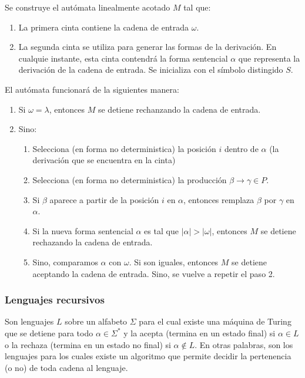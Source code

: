 \begin{demo}[0.8\textwidth]
  Se construye el autómata linealmente acotado \(M\) tal que:
  \begin{enumerate}
    \item La primera cinta contiene la cadena de entrada \textcentoldstyle\(\omega\)\textdollar.
    \item La segunda cinta se utiliza para generar las formas de la derivación. En cualquie instante, esta cinta contendrá la forma sentencial \(\alpha\) que representa la derivación de la cadena de entrada. Se inicializa con el símbolo distingido \(S\).
  \end{enumerate}

  El autómata funcionará de la siguientes manera:
  \begin{enumerate}
    \item Si \(\omega=\lambda\), entonces \(M\) se detiene rechanzando la cadena de entrada.
    \item Sino:
          \begin{enumerate}
            \item Selecciona (en forma no deterministica) la posición \(i\) dentro de \(\alpha\) (la derivación que se encuentra en la cinta)
            \item Selecciona (en forma no deterministica) la producción \(\beta\to\gamma\in P\).
            \item Si \(\beta\) aparece a partir de la posición \(i\) en \(\alpha\), entonces remplaza \(\beta\) por \(\gamma\) en \(\alpha\).
            \item Si la nueva forma sentencial \(\alpha\) es tal que \(|\alpha| > |\omega|\), entonces \(M\) se detiene rechazando la cadena de entrada.
            \item Sino, comparamos \(\alpha\) con \(\omega\). Si son iguales, entonces \(M\) se detiene aceptando la cadena de entrada. Sino, se vuelve a repetir el paso 2.
          \end{enumerate}
  \end{enumerate}
\end{demo}

\subsubsection{Lenguajes recursivos}
Son lenguajes \(L\) sobre un alfabeto \(\Sigma\) para el cual existe una máquina de Turing que se detiene para todo \(\alpha\in\Sigma^*\) y la acepta (termina en un estado final) si \(\alpha\in L\) o la rechaza (termina en un estado no final) si \(\alpha\notin L\). En otras palabras, son los lenguajes para los cuales existe un algoritmo que permite decidir la pertenencia (o no) de toda cadena al lenguaje.


